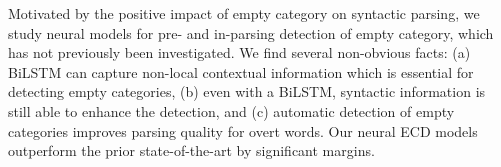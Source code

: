 Motivated by the positive impact of empty category on syntactic parsing, we study neural models for pre- and in-parsing detection of empty category, which has not previously been investigated. We find several non-obvious facts: (a) BiLSTM can capture non-local contextual information which is essential for detecting empty categories, (b) even with a BiLSTM, syntactic information is still able to enhance the detection, and (c) automatic detection of empty categories improves parsing quality for overt words. Our neural ECD models outperform the prior state-of-the-art by significant margins.
